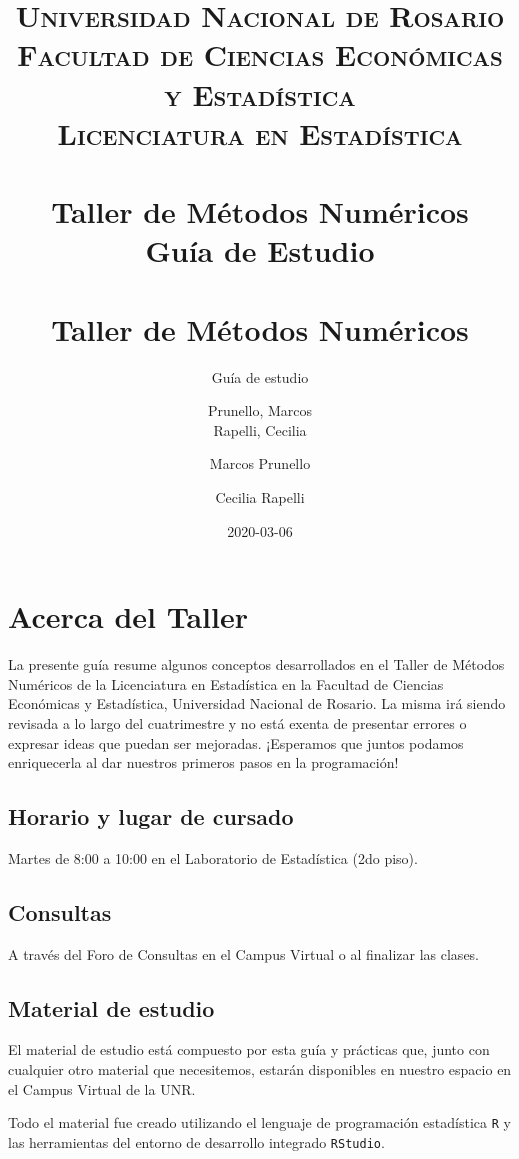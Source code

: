 \documentclass[openany]{book}
\title{
	\usefont{OT1}{bch}{b}{n}
	\normalfont \normalsize
	\textsc{
		Universidad Nacional de Rosario \\
		Facultad de Ciencias Económicas y Estadística \\
		Licenciatura en Estadística
	} \\ [25pt]
	\horrule{2pt} \\[0.4cm]
	\huge \textbf{Taller de Métodos Numéricos} \\
	\bigbreak
	Guía de Estudio\\
	\horrule{2pt} \\[0.5cm]}
\author{
	\normalfont Prunello, Marcos \\
	\normalfont Rapelli, Cecilia
}
\title{Taller de Métodos Numéricos}
\subtitle{Guía de estudio}
\author{Marcos Prunello \and Cecilia Rapelli}
\date{2020-03-06}
\begin{document}
\maketitle

{
\setcounter{tocdepth}{1}
\tableofcontents
}
\hypertarget{acerca-del-taller}{%
\chapter*{Acerca del Taller}\label{acerca-del-taller}}

La presente guía resume algunos conceptos desarrollados en el Taller de Métodos Numéricos de la Licenciatura en Estadística en la Facultad de Ciencias Económicas y Estadística, Universidad Nacional de Rosario. La misma irá siendo revisada a lo largo del cuatrimestre y no está exenta de presentar errores o expresar ideas que puedan ser mejoradas. ¡Esperamos que juntos podamos enriquecerla al dar nuestros primeros pasos en la programación!

\hypertarget{horario-y-lugar-de-cursado}{%
\section*{Horario y lugar de cursado}\label{horario-y-lugar-de-cursado}}

Martes de 8:00 a 10:00 en el Laboratorio de Estadística (2do piso).

\hypertarget{consultas}{%
\section*{Consultas}\label{consultas}}

A través del Foro de Consultas en el Campus Virtual o al finalizar las clases.

\hypertarget{material-de-estudio}{%
\section*{Material de estudio}\label{material-de-estudio}}

El material de estudio está compuesto por esta guía y prácticas que, junto con cualquier otro material que necesitemos, estarán disponibles en nuestro espacio en el Campus Virtual de la UNR.

Todo el material fue creado utilizando el lenguaje de programación estadística \texttt{R} y las herramientas del entorno de desarrollo integrado \texttt{RStudio}.
\end{document}
